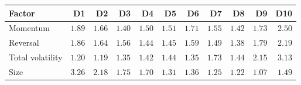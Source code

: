 \begin{tabular}{lrrrrrrrrrr}
\toprule
Factor & D1 & D2 & D3 & D4 & D5 & D6 & D7 & D8 & D9 & D10 \\
\midrule
Momentum & $1.89$ & $1.66$ & $1.40$ & $1.50$ & $1.51$ & $1.71$ & $1.55$ & $1.42$ & $1.73$ & $2.50$ \\
Reversal & $1.86$ & $1.64$ & $1.56$ & $1.44$ & $1.45$ & $1.59$ & $1.49$ & $1.38$ & $1.79$ & $2.19$ \\
Total volatility & $1.20$ & $1.19$ & $1.35$ & $1.42$ & $1.44$ & $1.35$ & $1.73$ & $1.44$ & $2.15$ & $3.13$ \\
Size & $3.26$ & $2.18$ & $1.75$ & $1.70$ & $1.31$ & $1.36$ & $1.25$ & $1.22$ & $1.07$ & $1.49$ \\
\bottomrule
\end{tabular}
